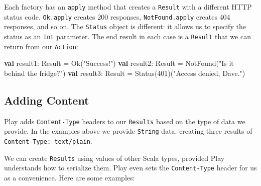 \documentclass[oneside,11pt,a4paper,]{book}
\newenvironment{Shaded}{\begin{snugshade}}{\end{snugshade}}
\newcommand{\KeywordTok}[1]{\textcolor[rgb]{0.13,0.29,0.53}{\textbf{{#1}}}}
\newcommand{\DecValTok}[1]{\textcolor[rgb]{0.00,0.00,0.81}{{#1}}}
\newcommand{\StringTok}[1]{\textcolor[rgb]{0.31,0.60,0.02}{{#1}}}
\newcommand{\FunctionTok}[1]{\textcolor[rgb]{0.00,0.00,0.00}{{#1}}}
\newcommand{\NormalTok}[1]{{#1}}
\begin{document}
Each factory has an \texttt{apply} method that creates a \texttt{Result}
with a different HTTP status code. \texttt{Ok.apply} creates 200
responses, \texttt{NotFound.apply} creates 404 responses, and so on. The
\texttt{Status} object is different: it allows us to specify the status
as an \texttt{Int} parameter. The end result in each case is a
\texttt{Result} that we can return from our \texttt{Action}:

\begin{Shaded}
\begin{Highlighting}[]
\KeywordTok{val} \NormalTok{result1: Result = }\FunctionTok{Ok}\NormalTok{(}\StringTok{"Success!"}\NormalTok{)}
\KeywordTok{val} \NormalTok{result2: Result = NotFound(}\StringTok{"Is it behind the fridge?"}\NormalTok{)}
\KeywordTok{val} \NormalTok{result3: Result = }\FunctionTok{Status}\NormalTok{(}\DecValTok{401}\NormalTok{)(}\StringTok{"Access denied, Dave."}\NormalTok{)}
\end{Highlighting}
\end{Shaded}

\subsection{Adding Content}\label{adding-content}

Play adds \texttt{Content-Type} headers to our \texttt{Results} based on
the type of data we provide. In the examples above we provide
\texttt{String} data. creating three results of
\texttt{Content-Type: text/plain}.

We can create \texttt{Results} using values of other Scala types,
provided Play understands how to serialize them. Play even sets the
\texttt{Content-Type} header for us as a convenience. Here are some
examples:
\end{document}

